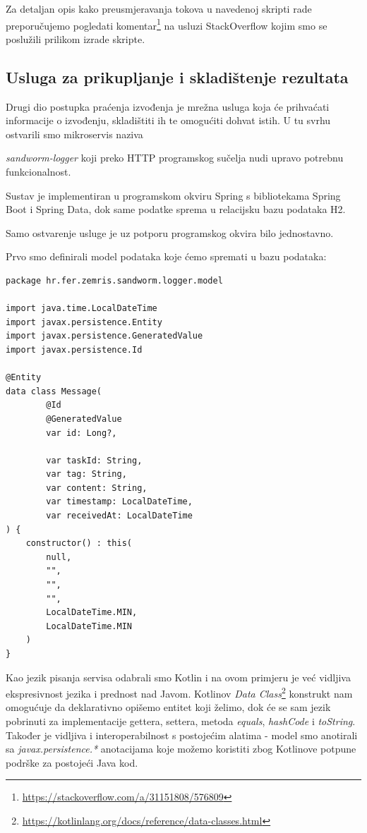 \documentclass[times, utf8, zavrsni]{fer}
\begin{document}
Za detaljan opis kako preusmjeravanja tokova u navedenoj skripti rade preporučujemo pogledati komentar{\footnote{\url{https://stackoverflow.com/a/31151808/576809}}} na usluzi StackOverflow kojim smo se poslužili prilikom izrade skripte.

\subsection{Usluga za prikupljanje i skladištenje rezultata}

Drugi dio postupka praćenja izvođenja je mrežna usluga koja će prihvaćati informacije o izvođenju, skladištiti ih te omogućiti dohvat istih. U tu svrhu ostvarili smo mikroservis naziva {\textit{sandworm-logger} koji preko HTTP programskog sučelja nudi upravo potrebnu funkcionalnost.

Sustav je implementiran u programskom okviru Spring s bibliotekama Spring Boot i Spring Data, dok same podatke sprema u relacijsku bazu podataka H2.

Samo ostvarenje usluge je uz potporu programskog okvira bilo jednostavno.

Prvo smo definirali model podataka koje ćemo spremati u bazu podataka:

\begin{lstlisting}
package hr.fer.zemris.sandworm.logger.model

import java.time.LocalDateTime
import javax.persistence.Entity
import javax.persistence.GeneratedValue
import javax.persistence.Id

@Entity
data class Message(
        @Id
        @GeneratedValue
        var id: Long?,

        var taskId: String,
        var tag: String,
        var content: String,
        var timestamp: LocalDateTime,
        var receivedAt: LocalDateTime
) {
    constructor() : this(
	 	null,
		"",
		"",
		"",
		LocalDateTime.MIN,
		LocalDateTime.MIN
	)
}
\end{lstlisting}

Kao jezik pisanja servisa odabrali smo Kotlin i na ovom primjeru je već vidljiva ekspresivnost jezika i prednost nad Javom. Kotlinov {\textit{Data Class}}{\footnote{\url{https://kotlinlang.org/docs/reference/data-classes.html}}} konstrukt nam omogućuje da deklarativno opišemo entitet koji želimo, dok će se sam jezik pobrinuti za implementacije gettera, settera, metoda {\textit{equals}}, {\textit{hashCode}} i {\textit{toString}}. Također je vidljiva i interoperabilnost s postojećim alatima - model smo anotirali sa {\textit{javax.persistence.*}} anotacijama koje možemo koristiti zbog Kotlinove potpune podrške za postojeći Java kod.


}
\end{document}
